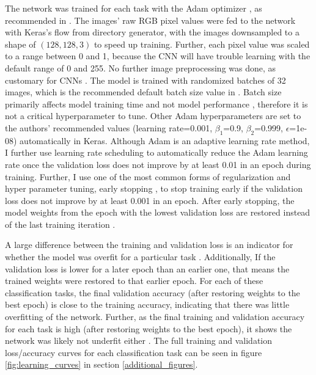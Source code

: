 \documentclass[10pt,twocolumn,letterpaper]{article}
\begin{document}
The network was trained for each task with the Adam optimizer \cite{DBLP:journals/corr/KingmaB14}, as recommended in \cite{karpathy_2018_nn3}. The images' raw RGB pixel values were fed to the network with Keras's flow from directory generator, with the images downsampled to a shape of $(128, 128, 3)$ to speed up training. Further, each pixel value was scaled to a range between 0 and 1, because the CNN will have trouble learning with the default range of 0 and 255. No further image preprocessing was done, as customary for CNNs \cite{DBLP:journals/corr/MishkinSM16}. The model is trained with randomized batches of 32 images, which is the recommended default batch size value in \cite{DBLP:journals/corr/abs-1206-5533}. Batch size primarily affects model training time and not model performance \cite{DBLP:journals/corr/abs-1206-5533}, therefore it is not a critical hyperparameter to tune. Other Adam hyperparameters are set to the authors' recommended values (learning rate=0.001, $\beta_1$=0.9, $\beta_2$=0.999, $\epsilon$=1e-08) \cite{DBLP:journals/corr/KingmaB14} automatically in Keras. Although Adam is an adaptive learning rate method, I further use learning rate scheduling \cite{karpathy_2018_nn3} to automatically reduce the Adam learning rate once the validation loss does not improve by at least 0.01 in an epoch during training. Further, I use one of the most common forms of regularization and hyper parameter tuning, early stopping \cite{SrihariEarlyStopping}\cite{HintonBengioYannDeepLearningSlides}, to stop training early if the validation loss does not improve by at least 0.001 in an epoch. After early stopping, the model weights from the epoch with the lowest validation loss are restored instead of the last training iteration \cite{SrihariEarlyStopping}.

A large difference between the training and validation loss is an indicator for whether the model was overfit for a particular task \cite{karpathy_2018_nn3}. Additionally, If the validation loss is lower for a later epoch than an earlier one, that means the trained weights were restored to that earlier epoch. For each of these classification tasks, the final validation accuracy (after restoring weights to the best epoch) is close to the training accuracy, indicating that there was little overfitting of the network. Further, as the final training and validation accuracy for each task is high (after restoring weights to the best epoch), it shows the network was likely not underfit either \cite[p.115]{goodfellow2016deep}\cite{andreopoulos2018CNN}. The full training and validation loss/accuracy curves for each classification task can be seen in figure \ref{fig:learning_curves} in section \ref{additional_figures}. 
\end{document}
